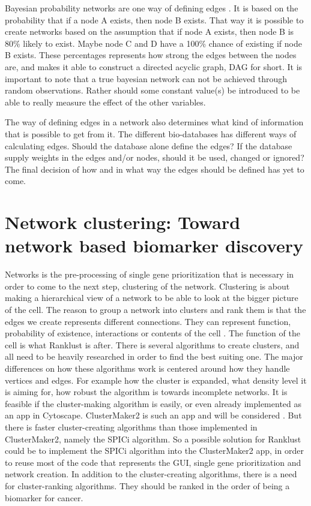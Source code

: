 \documentclass[UKenglish,11pt,a4paper]{article}
\begin{document}
Bayesian probability networks are one way of defining edges \cite{bayesiannetworks}. It is based on the probability that
if a node A exists, then node B exists. That way it is possible to create networks based on the assumption that if node
A exists, then node B is 80\% likely to exist. Maybe node C and D have a 100\% chance of existing if node B exists.
These percentages represents how strong the edges between the nodes are, and makes it able to construct a directed
acyclic graph, DAG for short. It is important to note that a true bayesian network can not be achieved through random 
observations. Rather should some constant value(s) be introduced to be able to really measure the effect of the other
variables.

The way of defining edges in a network also determines what kind of information that is possible to get from it. The
different bio-databases has different ways of calculating edges. Should the database alone define the edges? If the
database supply weights in the edges and/or nodes, should it be used, changed or ignored? The final decision of how and
in what way the edges should be defined has yet to come. 

\chapter{Network clustering: Toward network based biomarker discovery}
Networks is the pre-processing of single gene prioritization that is necessary in order to come to the next step,
clustering of the network. Clustering is about making a hierarchical view of a network to be able to look at the bigger
picture of the cell. The reason to group a network into clusters and rank them is that the edges we create represents
different connections. They can represent function, probability of existence, interactions or contents of the cell
\cite{siri}. The function of the cell is what Ranklust is after. There is several algorithms to create clusters, and all
need to be heavily researched in order to find the best suiting one. The major differences on how these algorithms work
is centered around how they handle vertices and edges. For example how the cluster is expanded, what density level it is
aiming for, how robust the algorithm is towards incomplete networks. It is feasible if the cluster-making algorithm is
easily, or even already implemented as an app in Cytoscape. ClusterMaker2 is such an app and will be considered
\cite{cm2}. But there is faster cluster-creating algorithms than those implemented in ClusterMaker2, namely the SPICi
\cite{spici} algorithm. So a possible solution for Ranklust could be to implement the SPICi algorithm into the
ClusterMaker2 app, in order to reuse most of the code that represents the GUI, single gene prioritization and network
creation. In addition to the cluster-creating algorithms, there is a need for cluster-ranking algorithms. They should be
ranked in the order of being a biomarker for cancer.
\end{document}
